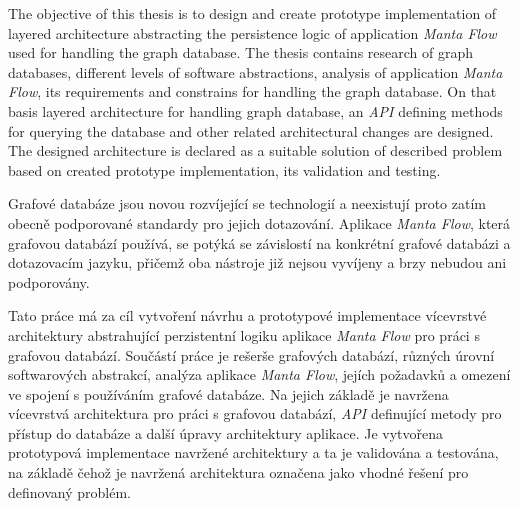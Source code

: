 \documentclass[11pt,twoside,a4paper]{book}
\begin{document}
   The objective of this thesis is to design and create prototype implementation of layered architecture abstracting the persistence logic of application \textit{Manta Flow} used for handling the graph database.
   The thesis contains research of graph databases, different levels of software abstractions, analysis of application \textit{Manta Flow}, its requirements and constrains for handling the graph database. On that basis layered architecture for handling graph database, an \textit{API} defining methods for querying the database and other related architectural changes are designed. The designed architecture is declared as a suitable solution of described problem based on created prototype implementation, its validation and testing.


	\baselineskip

	Grafové databáze jsou novou rozvíjející se technologií a neexistují proto zatím obecně podporované standardy pro jejich dotazování. Aplikace \textit{Manta Flow}, která grafovou databází používá, se potýká se závislostí na konkrétní grafové databázi a dotazovacím jazyku, přičemž oba nástroje již nejsou vyvíjeny a brzy nebudou ani podporovány.

   Tato práce má za cíl vytvoření návrhu a prototypové implementace vícevrstvé architektury abstrahující perzistentní logiku aplikace \textit{Manta Flow} pro práci s grafovou databází.
   Součástí práce je rešerše grafových databází, různých úrovní softwarových abstrakcí, analýza aplikace \textit{Manta Flow}, jejích požadavků a omezení ve spojení s používáním grafové databáze. Na jejich základě je navržena vícevrstvá architektura pro práci s grafovou databází, \textit{API} definující metody pro přístup do databáze a další úpravy architektury aplikace. Je vytvořena prototypová implementace navržené architektury a ta je validována a testována, na základě čehož je navržená architektura označena jako vhodné řešení pro definovaný problém.


	\tableofcontents		%

	\listoffigures			%
	\listoftables			%
	\lstlistoflistings         %

	\mainbodystarts
\end{document}
